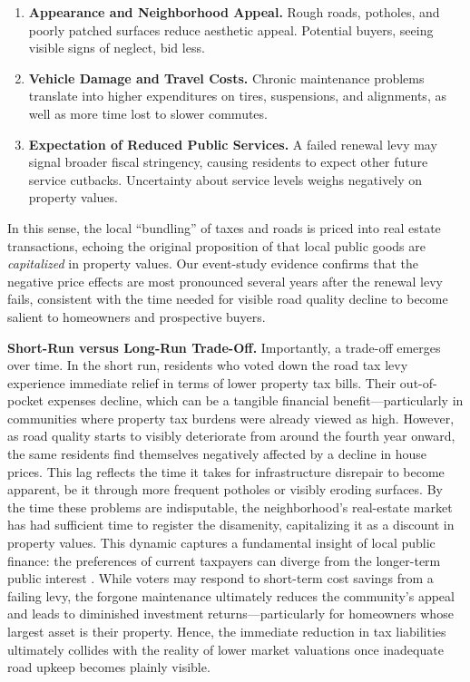 \begin{enumerate}
    \item \textbf{Appearance and Neighborhood Appeal.} Rough roads, potholes, and poorly patched surfaces reduce aesthetic appeal. Potential buyers, seeing visible signs of neglect, bid less.
    \item \textbf{Vehicle Damage and Travel Costs.} Chronic maintenance problems translate into higher expenditures on tires, suspensions, and alignments, as well as more time lost to slower commutes.
    \item \textbf{Expectation of Reduced Public Services.} A failed renewal levy may signal broader fiscal stringency, causing residents to expect other future service cutbacks. Uncertainty about service levels weighs negatively on property values. 
\end{enumerate}

\noindent In this sense, the local “bundling” of taxes and roads is priced into real estate transactions, echoing the original proposition of \cite{Tiebout1956} that local public goods are \emph{capitalized} in property values. Our event-study evidence confirms that the negative price effects are most pronounced several years after the renewal levy fails, consistent with the time needed for visible road quality decline to become salient to homeowners and prospective buyers.

{\bf Short-Run versus Long-Run Trade-Off.} Importantly, a trade-off emerges over time. In the short run, residents who voted down the road tax levy experience immediate relief in terms of lower property tax bills. Their out-of-pocket expenses decline, which can be a tangible financial benefit—particularly in communities where property tax burdens were already viewed as high. However, as road quality starts to visibly deteriorate from around the fourth year onward, the same residents find themselves negatively affected by a decline in house prices. This lag reflects the time it takes for infrastructure disrepair to become apparent, be it through more frequent potholes or visibly eroding surfaces. By the time these problems are indisputable, the neighborhood’s real-estate market has had sufficient time to register the disamenity, capitalizing it as a discount in property values. This dynamic captures a fundamental insight of local public finance: the preferences of current taxpayers can diverge from the longer-term public interest \citep{BuchananTullock1962, AlesinaTabellini1990}. While voters may respond to short-term cost savings from a failing levy, the forgone maintenance ultimately reduces the community’s appeal and leads to diminished investment returns—particularly for homeowners whose largest asset is their property. Hence, the immediate reduction in tax liabilities ultimately collides with the reality of lower market valuations once inadequate road upkeep becomes plainly visible.

